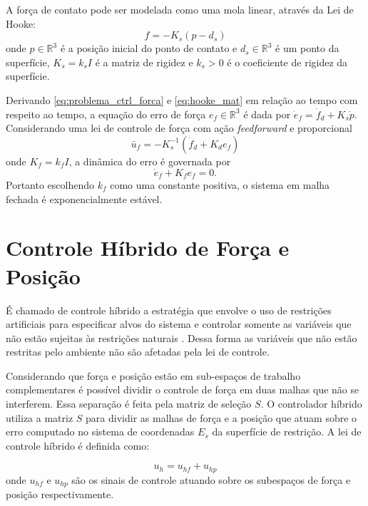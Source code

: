 A força de contato pode ser modelada como uma mola linear, através da Lei de Hooke:
\begin{equation} \label{eq:hooke_mat}
{f} = -{K}_s ({p} - {d}_s)
\end{equation}
onde ${p} \in \mathbb{R}^3$ é a posição inicial do ponto de contato e ${d}_s \in \mathbb{R}^3$ é um ponto da superfície, ${K}_s = k_s I$ é a matriz de rigidez e $k_s > 0$ é o coeficiente de rigidez da superfície.

Derivando \eqref{eq:problema_ctrl_forca} e \eqref{eq:hooke_mat} em relação ao tempo com respeito ao tempo, a equação do erro de força $e_f \in \mathbb{R}^3$ é dada por $\dot{{e}}_f = \dot{{f}}_d + {K}_s \dot{{p}}$. Considerando uma lei de controle de força com ação \textit{feedforward} e proporcional
\begin{equation}
{\bar{u}}_f = -{K}_s^{-1} (\dot{{f}}_d + {K}_d {e}_f)
\end{equation}
onde ${K}_f = k_f {I}$, a dinâmica do erro é governada por
\begin{equation}
\dot{{e}}_f + {K}_f {e}_f = 0.
\end{equation}
Portanto escolhendo $k_f$ como uma constante positiva, o sistema em malha fechada é exponencialmente estável. 

\section{Controle Híbrido de Força e Posição}

É chamado de controle híbrido a estratégia que envolve o uso de restrições artificiais para especificar alvos do sistema e controlar somente as variáveis que não estão sujeitas às restrições naturais \citep{xaud2016doris}. Dessa forma as variáveis que não estão restritas pelo ambiente não são afetadas pela lei de controle.

Considerando que força e posição estão em sub-espaços de trabalho complementares é possível dividir o controle de força em duas malhas que não se interferem. Essa separação é feita pela matriz de seleção ${S}$. O controlador híbrido utiliza a matriz ${S}$ para dividir as malhas de  força e a posição  que atuam sobre o erro computado no sistema de coordenadas ${E}_s$ da superfície de restrição. A lei de controle híbrido é definida como:

\begin{equation} \label{eq:ctrl_law}
{u}_h = {u}_{hf} + {u}_{hp}
\end{equation}
onde $u_{hf}$ e $u_{hp}$ são os sinais de controle atuando sobre os subespaços de força e posição respectivamente. 

